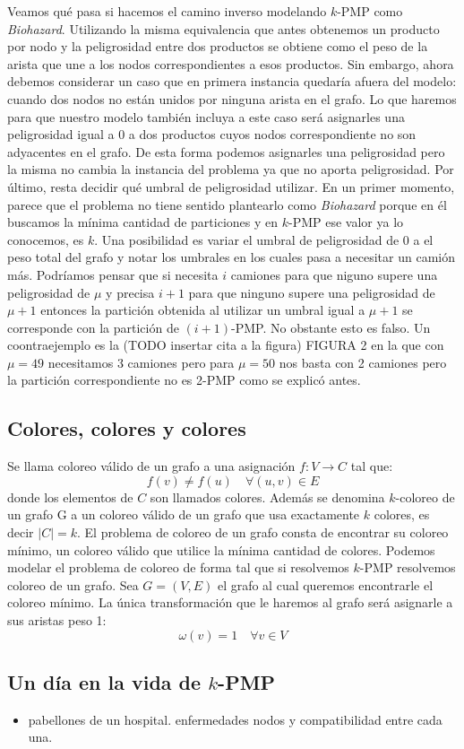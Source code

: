 Veamos qué pasa si hacemos el camino inverso modelando $k$-PMP como \emph{Biohazard}. Utilizando la misma equivalencia que antes obtenemos
un producto por nodo y la peligrosidad entre dos productos se obtiene como el peso de la arista que une a los nodos correspondientes a esos
productos. Sin embargo, ahora debemos considerar un caso que en primera instancia quedaría afuera del modelo: cuando dos nodos no están unidos 
por ninguna arista en el grafo. Lo que haremos para que nuestro modelo también incluya a este caso será asignarles una peligrosidad igual a 0 
a dos productos cuyos nodos correspondiente no son adyacentes en el grafo. De esta forma podemos asignarles una peligrosidad pero la misma no 
cambia la instancia del problema ya que no aporta peligrosidad. Por último, resta decidir qué umbral de peligrosidad utilizar. En un primer 
momento, parece que el problema no tiene sentido plantearlo como \emph{Biohazard} porque en él buscamos la mínima cantidad de particiones y 
en $k$-PMP ese valor ya lo conocemos, es $k$. Una posibilidad es variar el umbral de peligrosidad de 0 a el peso total del grafo y notar 
los umbrales en los cuales pasa a necesitar un camión más. Podríamos pensar que si necesita $i$ camiones para que niguno supere una peligrosidad
de $\mu$ y precisa $i+1$ para que ninguno supere una peligrosidad de $\mu + 1$ entonces la partición obtenida al utilizar un umbral igual a
$\mu + 1$ se corresponde con la partición de $(i+1)$-PMP. No obstante esto es falso. Un coontraejemplo es la (TODO insertar cita a la figura) FIGURA 2
en la que con $\mu = 49$ necesitamos 3 camiones pero para $\mu = 50$ nos basta con 2 camiones pero la partición correspondiente no es 2-PMP como se
explicó antes.

\subsection{Colores, colores y colores}

Se llama coloreo válido de un grafo a una asignación $f:V \rightarrow C$ tal que:
\begin{displaymath}
f(v) \neq f(u) \quad \forall (u, v) \in E
\end{displaymath}
donde los elementos de $C$ son llamados colores. Además se denomina $k$-coloreo de un grafo G a un coloreo
válido de un grafo que usa exactamente $k$ colores, es decir $\left\vert{C}\right\vert = k$. El problema de coloreo
de un grafo consta de encontrar su coloreo mínimo, un coloreo válido que utilice la mínima cantidad de colores. Podemos
modelar el problema de coloreo de forma tal que si resolvemos $k$-PMP resolvemos coloreo de un grafo.
Sea $G = (V, E)$ el grafo al cual queremos encontrarle el coloreo mínimo. La única transformación que le haremos al grafo 
será asignarle a sus aristas peso 1:
\begin{displaymath}
\omega(v) = 1 \quad \forall v \in V
\end{displaymath}




\subsection{Un día en la vida de $k$-PMP}

\begin{itemize}
  \item pabellones de un hospital. enfermedades nodos y compatibilidad entre cada una.
\end{itemize}
